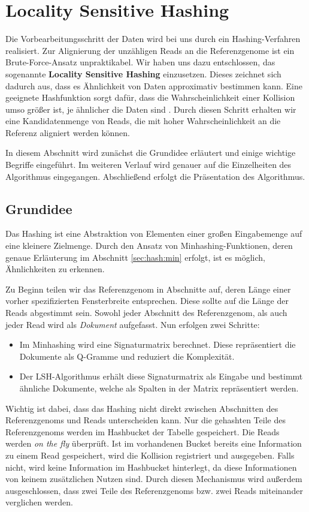 \chapter{Locality Sensitive Hashing}
\label{sec:lsh}
Die Vorbearbeitungsschritt der Daten wird bei uns durch ein Hashing-Verfahren realisiert. Zur Alignierung der unzähligen Reads an die Referenzgenome ist ein Brute-Force-Ansatz unpraktikabel. Wir haben uns dazu entschlossen, das sogenannte \textbf{Locality Sensitive Hashing} einzusetzen. Dieses zeichnet sich dadurch aus, dass es Ähnlichkeit von Daten approximativ bestimmen kann. Eine geeignete Hashfunktion sorgt dafür, dass die Wahrscheinlichkeit einer Kollision umso größer ist, je ähnlicher die Daten sind \citep{Gionis1999}. Durch diesen Schritt erhalten wir eine Kandidatenmenge von Reads, die mit hoher Wahrscheinlichkeit an die Referenz aligniert werden können. 

In diesem Abschnitt wird zunächst die Grundidee erläutert und einige wichtige Begriffe eingeführt. Im weiteren Verlauf wird genauer auf die Einzelheiten des Algorithmus eingegangen. Abschließend erfolgt die Präsentation des Algorithmus.
\section{Grundidee}
\label{sec:hash:idee}
Das Hashing ist eine Abstraktion von Elementen einer großen Eingabemenge auf eine kleinere Zielmenge. Durch den Ansatz von Minhashing-Funktionen, deren genaue Erläuterung im Abschnitt \ref{sec:hash:min} erfolgt, ist es möglich, Ähnlichkeiten zu erkennen. 

Zu Beginn teilen wir das Referenzgenom in Abschnitte auf, deren Länge einer vorher spezifizierten Fensterbreite entsprechen. Diese sollte auf die Länge der Reads abgestimmt sein. Sowohl jeder Abschnitt des Referenzgenom, als auch jeder Read wird als \textit{Dokument} aufgefasst. Nun erfolgen zwei Schritte:
\begin{itemize}
	\item Im Minhashing wird eine Signaturmatrix berechnet. Diese repräsentiert die Dokumente als Q-Gramme und reduziert die Komplexität.
	\item Der LSH-Algorithmus erhält diese Signaturmatrix als Eingabe und bestimmt ähnliche Dokumente, welche als Spalten in der Matrix repräsentiert werden.
\end{itemize}
Wichtig ist dabei, dass das Hashing nicht direkt zwischen Abschnitten des Referenzgenoms und Reads unterscheiden kann. Nur die gehashten Teile des Referenzgenoms werden im Hashbucket der Tabelle gespeichert. Die Reads werden \textit{on the fly} überprüft. Ist im vorhandenen Bucket bereits eine Information zu einem Read gespeichert, wird die Kollision registriert und ausgegeben. Falls nicht, wird keine Information im Hashbucket hinterlegt, da diese Informationen von keinem zusätzlichen Nutzen sind. Durch diesen Mechanismus wird außerdem ausgeschlossen, dass zwei Teile des Referenzgenoms bzw. zwei Reads miteinander verglichen werden.

